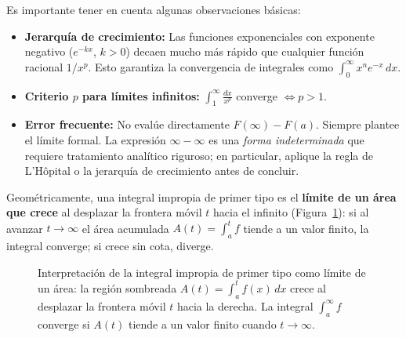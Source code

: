 \begin{rem}Es importante tener en cuenta algunas observaciones básicas:
\begin{itemize}
    \item \textbf{Jerarquía de crecimiento:} Las funciones exponenciales con exponente negativo
          ($e^{-kx}$, $k>0$) decaen mucho más rápido que cualquier función racional $1/x^p$. Esto
          garantiza la convergencia de integrales como $\int_0^\infty x^n e^{-x}\,dx$.

    \item \textbf{Criterio $p$ para límites infinitos:}
          $\displaystyle\int_{1}^{\infty}\frac{dx}{x^p}$ converge
          $\iff p>1$.

    \item \textbf{Error frecuente:} No evalúe directamente $F(\infty)-F(a)$. Siempre plantee el
          límite formal. La expresión $\infty - \infty$ es una \emph{forma indeterminada} que
          requiere tratamiento analítico riguroso; en particular, aplique la regla de L'Hôpital o
          la jerarquía de crecimiento antes de concluir.
\end{itemize}
\end{rem}

Geométricamente, una integral impropia de primer tipo es el \textbf{límite de
un área que crece} al desplazar la frontera móvil $t$ hacia el infinito
(Figura~\ref{fig:impropia_area_creciente}): si al avanzar $t\to\infty$ el área
acumulada $A(t)=\int_a^t f$ tiende a un valor finito, la integral converge; si
crece sin cota, diverge.

\begin{figure}[!htbp]
\centering
{}
\caption{Interpretación de la integral impropia de primer tipo como límite de
un área: la región sombreada $A(t)=\int_a^t f(x)\,dx$ crece al desplazar la
frontera móvil $t$ hacia la derecha. La integral $\int_a^\infty f$ converge si
$A(t)$ tiende a un valor finito cuando $t\to\infty$.}
\label{fig:impropia_area_creciente}
\end{figure}

